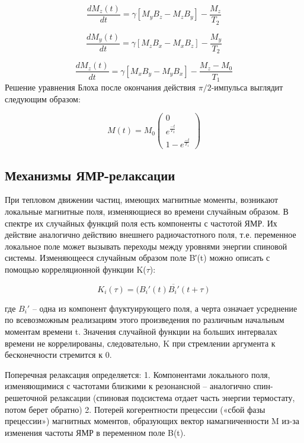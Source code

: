 \documentclass{article}
\begin{document}
\begin{equation*}
    \frac{dM_z(t)}{dt} = \gamma [M_y B_z - M_z B_y] - \frac{M_z}{T_2} 
\end{equation*}

\begin{equation*}
    \frac{dM_y(t)}{dt} = \gamma [M_z B_x - M_x B_z] - \frac{M_y}{T_2} 
\end{equation*}  
    
\begin{equation*}
    \frac{dM_z(t)}{dt} = \gamma [M_x B_y - M_y B_x] - \frac{M_z - M_0}{T_1}
\end{equation*}
Решение уравнения Блоха после окончания действия $\pi/2$-импульса выглядит следующим образом:

\begin{equation*}
M(t) = M_0\begin{pmatrix}0\\e^\frac{-t}{T_2}\\1 - e^{\frac{-t}{T_1}} \end{pmatrix}
\end{equation*}

\subsection{Механизмы ЯМР-релаксации}
При тепловом движении частиц, имеющих магнитные моменты, возникают локальные магнитные поля, изменяющиеся во времени случайным образом. В спектре их случайных функций поля есть компоненты с частотой ЯМР. Их действие аналогично действию внешнего радиочастотного поля, т.е. переменное локальное поле может вызывать переходы между уровнями энергии спиновой системы. Изменяющееся случайным образом поле B′(t) можно описать с помощью корреляционной
функции K($\tau$):

\begin{equation*}
    K_i(\tau) = \overline{(B_i'(t) B_i'(t+\tau)}
\end{equation*}

где $B_i′$ – одна из компонент флуктуирующего поля, а черта означает усреднение по всевозможным реализациям этого произведения по различным начальным моментам времени t. Значения случайной функции на больших интервалах времени не коррелированы, следовательно, K при стремлении аргумента к бесконечности стремится к 0.

\item Поперечная релаксация определяется:
1. Компонентами локального поля, изменяющимися с частотами близкими к резонансной – аналогично спин-решеточной релаксации (спиновая подсистема отдает часть энергии термостату, потом берет обратно)
2. Потерей когерентности прецессии («сбой фазы прецессии») магнитных моментов, образующих вектор намагниченности  M из-за изменения частоты ЯМР в переменном поле B(t).
\end{document}
